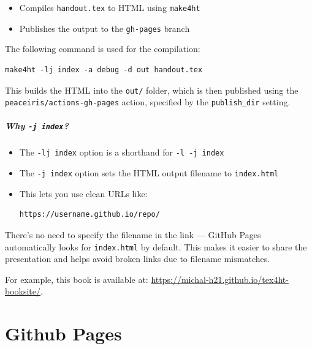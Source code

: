 \documentclass{book}
\begin{document}
\begin{itemize}
  \item Compiles \texttt{handout.tex} to HTML using \texttt{make4ht}
  \item Publishes the output to the \texttt{gh-pages} branch
\end{itemize}

The following command is used for the compilation:

\begin{verbatim}
make4ht -lj index -a debug -d out handout.tex
\end{verbatim}


This builds the HTML into the \texttt{out/} folder, which is then published
using the \texttt{peaceiris/actions-gh-pages} action, specified by the
\texttt{publish\_dir} setting.


\paragraph{Why \texttt{-j index}?}
\begin{itemize}
  \item The \texttt{-lj index} option is a shorthand for \texttt{-l -j index}
  \item The \texttt{-j index} option sets the HTML output filename to \texttt{index.html}
  \item This lets you use clean URLs like:
  
\begin{verbatim}
https://username.github.io/repo/
\end{verbatim}

\end{itemize}


There’s no need to specify the filename in the link — GitHub Pages
automatically looks for \texttt{index.html} by default. This makes it easier to share
the presentation and helps avoid broken links due to filename mismatches.

For example, this book is available at: \url{https://michal-h21.github.io/tex4ht-booksite/}.

\chapter{Github Pages}
\end{document}
